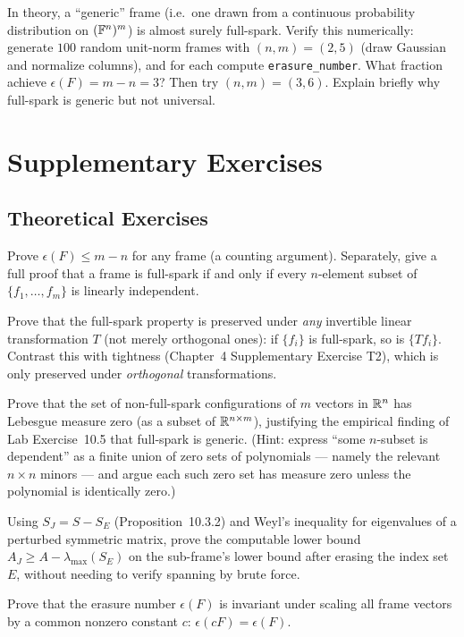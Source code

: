 \begin{exercisebox}[title={Lab Exercise 10.5 (Challenge): Full-Spark Random Frames}]
In theory, a ``generic'' frame (i.e.\ one drawn from a continuous
probability distribution on $(\mathbb{F}^n)^m$) is almost surely full-spark.
Verify this numerically: generate $100$ random unit-norm frames with
$(n,m)=(2,5)$ (draw Gaussian and normalize columns), and for each
compute \texttt{erasure\_number}. What fraction achieve $\epsilon(F)=m-n=3$?
Then try $(n,m)=(3,6)$. Explain briefly why full-spark is generic but
not universal.
\end{exercisebox}
\newpage
\section{Supplementary Exercises}
\label{sec:extra-ch10}

\subsection*{Theoretical Exercises}
\begin{theoexercises}
	\item Prove $\epsilon(F)\le m-n$ for any frame (a counting argument).
	Separately, give a full proof that a frame is full-spark if and
	only if every $n$-element subset of $\{f_1,\ldots,f_m\}$ is
	linearly independent.
	
	\item Prove that the full-spark property is preserved under \emph{any}
	invertible linear transformation $T$ (not merely orthogonal
	ones): if $\{f_i\}$ is full-spark, so is $\{Tf_i\}$. Contrast this
	with tightness (Chapter~4 Supplementary Exercise T2), which is
	only preserved under \emph{orthogonal} transformations.
	
	\item Prove that the set of non-full-spark configurations of $m$
	vectors in $\mathbb{R}^n$ has Lebesgue measure zero (as a subset of
	$\mathbb{R}^{n\times m}$), justifying the empirical finding of Lab
	Exercise~10.5 that full-spark is generic. (Hint: express
	``some $n$-subset is dependent'' as a finite union of zero sets
	of polynomials --- namely the relevant $n\times n$ minors --- and
	argue each such zero set has measure zero unless the polynomial
	is identically zero.)
	
	\item Using $S_J=S-S_E$ (Proposition~10.3.2) and Weyl's inequality for
	eigenvalues of a perturbed symmetric matrix, prove the computable
	lower bound $A_J\ge A-\lambda_{\max}(S_E)$ on the sub-frame's
	lower bound after erasing the index set $E$, without needing to
	verify spanning by brute force.
	
	\item Prove that the erasure number $\epsilon(F)$ is invariant under
	scaling all frame vectors by a common nonzero constant $c$:
	$\epsilon(cF)=\epsilon(F)$.
\end{theoexercises}

